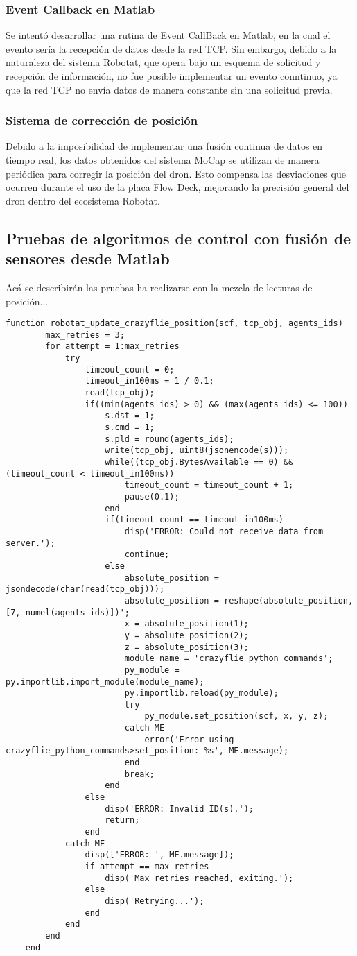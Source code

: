 \subsubsection{Event Callback en Matlab}
Se intentó desarrollar una rutina de Event CallBack en Matlab, en la cual el evento sería la recepción de datos desde la red TCP. Sin embargo, debido a la naturaleza del sistema Robotat, que opera bajo un esquema de solicitud y recepción de información, no fue posible implementar un evento conntinuo, ya que la red TCP no envía datos de manera constante sin una solicitud previa.

\subsubsection{Sistema de corrección de posición}
Debido a la imposibilidad de implementar una fusión continua de datos en tiempo real, los datos obtenidos del sistema MoCap se utilizan de manera periódica para corregir la posición del dron. Esto compensa las desviaciones que ocurren durante el uso de la placa Flow Deck, mejorando la precisión general del dron dentro del ecosistema Robotat. 

\subsection{Pruebas de algoritmos de control con fusión de sensores desde Matlab}
Acá se describirán las pruebas ha realizarse con la mezcla de lecturas de posición...

\newpage
\begin{lstlisting}[caption=Función para actualización de posición absoluta del Crazyflie desde Matlab., label=code:robotat_]
	function robotat_update_crazyflie_position(scf, tcp_obj, agents_ids)
		max_retries = 3; 
		for attempt = 1:max_retries
			try
				timeout_count = 0;
				timeout_in100ms = 1 / 0.1;
				read(tcp_obj); 				
				if((min(agents_ids) > 0) && (max(agents_ids) <= 100))
					s.dst = 1; 
					s.cmd = 1; 
					s.pld = round(agents_ids);
					write(tcp_obj, uint8(jsonencode(s)));  
					while((tcp_obj.BytesAvailable == 0) && (timeout_count < timeout_in100ms))
						timeout_count = timeout_count + 1;
						pause(0.1);
					end					
					if(timeout_count == timeout_in100ms)
						disp('ERROR: Could not receive data from server.');
						continue;
					else
						absolute_position = jsondecode(char(read(tcp_obj)));
						absolute_position = reshape(absolute_position, [7, numel(agents_ids)])';						
						x = absolute_position(1);
						y = absolute_position(2);
						z = absolute_position(3);						
						module_name = 'crazyflie_python_commands'; 
						py_module = py.importlib.import_module(module_name);  
						py.importlib.reload(py_module);						
						try
							py_module.set_position(scf, x, y, z);
						catch ME
							error('Error using crazyflie_python_commands>set_position: %s', ME.message);
						end 						
						break;
					end
				else
					disp('ERROR: Invalid ID(s).');
					return;
				end			
			catch ME
				disp(['ERROR: ', ME.message]);
				if attempt == max_retries
					disp('Max retries reached, exiting.');
				else
					disp('Retrying...');
				end
			end
		end
	end
\end{lstlisting}

